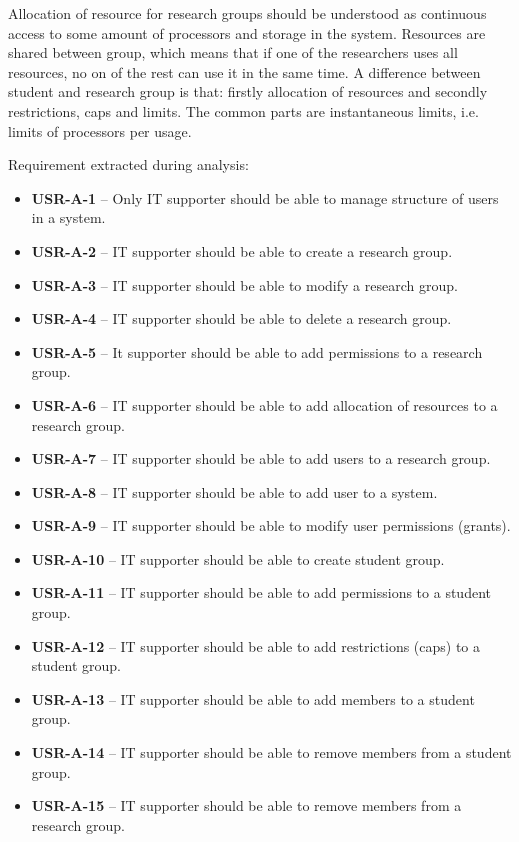 \documentclass{report}
\begin{document}
	Allocation of resource for research groups should be understood as continuous access to some amount of processors and storage in the system. Resources are shared between group, which means that if one of the researchers uses all resources, no on of the rest can use it in the same time. A difference between student and research group is that: firstly allocation of resources and secondly restrictions, caps and limits. The common parts are instantaneous limits, i.e. limits of processors per usage.
	
Requirement extracted during analysis:
\begin{itemize}
	\item
	{
		\textbf{USR-A-1} -- Only IT supporter should be able to manage structure of users in a system.
	}
	\item
	{
		\textbf{USR-A-2} -- IT supporter should be able to create a research group.
	}
	\item
	{
		\textbf{USR-A-3} -- IT supporter should be able to modify a research group.
	}
	\item
	{
		\textbf{USR-A-4} -- IT supporter should be able to delete a research group.
	}
	\item
	{
		\textbf{USR-A-5} -- It supporter should be able to add permissions to a research group.
	}
	\item
	{
		\textbf{USR-A-6} -- IT supporter should be able to add allocation of resources to a research group.
	}
	\item
	{
		\textbf{USR-A-7} -- IT supporter should be able to add users to a research group.
	}
	\item
	{
		\textbf{USR-A-8} -- IT supporter should be able to add user to a system.
	}
	\item
	{
		\textbf{USR-A-9} -- IT supporter should be able to modify user permissions (grants).
	}
	\item
	{
		\textbf{USR-A-10} -- IT supporter should be able to create student group.
	}
	\item
	{
		\textbf{USR-A-11} -- IT supporter should be able to add permissions to a student group.
	}
	\item
	{
		\textbf{USR-A-12} -- IT supporter should be able to add restrictions (caps) to a student group.
	}
	\item
	{
		\textbf{USR-A-13} -- IT supporter should be able to add members to a student group.
	}
	\item
	{
		\textbf{USR-A-14} -- IT supporter should be able to remove members from a student group.
	}
	\item
	{
		\textbf{USR-A-15} -- IT supporter should be able to remove members from a research group.
	}
\end{itemize}
\end{document}

